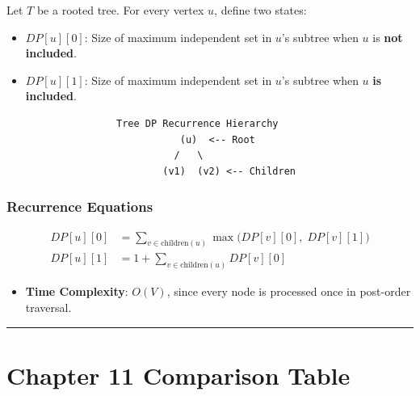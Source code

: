 \documentclass[
]{book}
\providecommand{\tightlist}{%
  \setlength{\itemsep}{0pt}\setlength{\parskip}{0pt}}
\theoremstyle{definition}
\theoremstyle{definition}
\theoremstyle{definition}
\theoremstyle{definition}
\theoremstyle{remark}
\begin{document}
Let \(T\) be a rooted tree. For every vertex \(u\), define two states:

\begin{itemize}
\tightlist
\item
  \(DP[u][0]\): Size of maximum independent set in \(u\)'s subtree when \(u\) is \textbf{not included}.
\item
  \(DP[u][1]\): Size of maximum independent set in \(u\)'s subtree when \(u\) \textbf{is included}.
\end{itemize}

\begin{verbatim}
                   Tree DP Recurrence Hierarchy
                              (u)  <-- Root
                             /   \
                           (v1)  (v2) <-- Children
\end{verbatim}

\subsubsection{Recurrence Equations}\label{recurrence-equations}

\[\begin{aligned} DP[u][0] &= \sum_{v \in \text{children}(u)} \max \Big( DP[v][0], \; DP[v][1] \Big) \\ DP[u][1] &= 1 + \sum_{v \in \text{children}(u)} DP[v][0] \end{aligned}\]

\begin{itemize}
\tightlist
\item
  \textbf{Time Complexity}: \(O(V)\), since every node is processed once in post-order traversal.
\end{itemize}

\begin{center}\rule{0.5\linewidth}{0.5pt}\end{center}

\section{Chapter 11 Comparison Table}\label{chapter-11-comparison-table}
\end{document}
